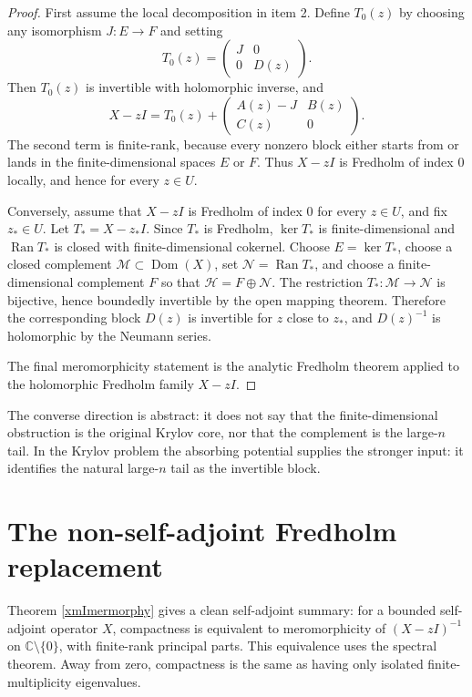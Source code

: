 \documentclass[JHEP,12pt]{article}
\begin{document}
\begin{proof}
First assume the local decomposition in item 2. Define
\(T_0(z)\) by choosing any isomorphism \(J:E\to F\) and setting
\[
T_0(z)=
\begin{pmatrix}
J & 0\\
0 & D(z)
\end{pmatrix}.
\]
Then \(T_0(z)\) is invertible with holomorphic inverse, and
\[
X-zI=T_0(z)+
\begin{pmatrix}
A(z)-J & B(z)\\
C(z) & 0
\end{pmatrix}.
\]
The second term is finite-rank, because every nonzero block either starts from
or lands in the finite-dimensional spaces \(E\) or \(F\). Thus \(X-zI\) is
Fredholm of index \(0\) locally, and hence for every \(z\in U\).

Conversely, assume that \(X-zI\) is Fredholm of index \(0\) for every
\(z\in U\), and fix \(z_\ast\in U\). Let \(T_\ast=X-z_\ast I\). Since
\(T_\ast\) is Fredholm, \(\ker T_\ast\) is finite-dimensional and
\(\operatorname{Ran}T_\ast\) is closed with finite-dimensional cokernel. Choose
\(E=\ker T_\ast\), choose a closed complement
\(\mathcal M\subset\operatorname{Dom}(X)\), set
\(\mathcal N=\operatorname{Ran}T_\ast\), and choose a finite-dimensional
complement \(F\) so that \(\mathcal H=F\oplus\mathcal N\). The restriction
\(T_\ast:\mathcal M\to\mathcal N\) is bijective, hence boundedly invertible by
the open mapping theorem. Therefore the corresponding block \(D(z)\) is
invertible for \(z\) close to \(z_\ast\), and \(D(z)^{-1}\) is holomorphic by
the Neumann series.

The final meromorphicity statement is the analytic Fredholm theorem applied to
the holomorphic Fredholm family \(X-zI\).
\end{proof}

The converse direction is abstract: it does not say that the finite-dimensional
obstruction is the original Krylov core, nor that the complement is the
large-\(n\) tail. In the Krylov problem the absorbing potential supplies the
stronger input: it identifies the natural large-\(n\) tail as the invertible
block.


\section{The non-self-adjoint Fredholm replacement}

Theorem \ref{xmImermorphy} gives a clean self-adjoint summary: for a bounded
self-adjoint operator \(X\), compactness is equivalent to meromorphicity of
\((X-zI)^{-1}\) on \(\mathbb C\setminus\{0\}\), with finite-rank principal
parts. This equivalence uses the spectral theorem. Away from zero, compactness
is the same as having only isolated finite-multiplicity eigenvalues.
\end{document}
